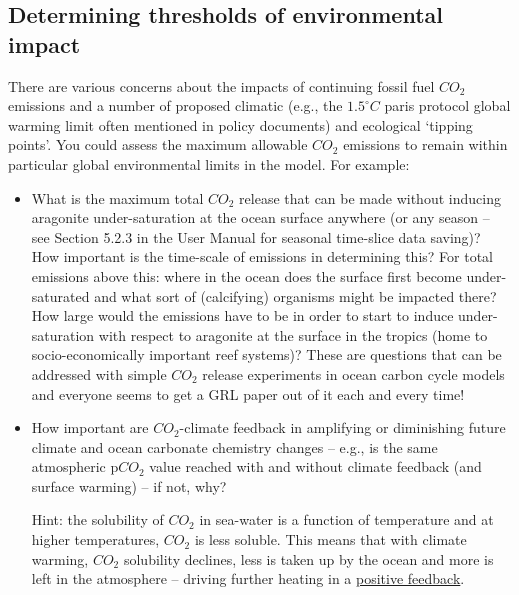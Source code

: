 \subsection{Determining thresholds of environmental impact}

There are various concerns about the impacts of continuing fossil fuel \(CO_{2}\) emissions and a number of proposed climatic (e.g., the \(1.5^{\circ} C \) paris protocol global warming limit often mentioned in policy documents) and ecological ‘tipping points’. You could assess the maximum allowable \(CO_{2}\) emissions to remain within particular global environmental limits in the model. For example:

\begin{itemize}[noitemsep]

\vspace{1mm}
\item What is the maximum total \(CO_{2}\) release that can be made without inducing aragonite under-saturation at the ocean surface anywhere (or any season – see Section 5.2.3 in the User Manual for seasonal time-slice data saving)? How important is the time-scale of emissions in determining this? For total emissions above this: where in the ocean does the surface first become under-saturated and what sort of (calcifying) organisms might be impacted there? How large would the emissions have to be in order to start to induce under-saturation with respect to aragonite at the surface in the tropics (home to socio-economically important reef systems)? These are questions that can be addressed with simple \(CO_{2}\) release experiments in ocean carbon cycle models and everyone seems to get a GRL paper out of it each and every time!

\vspace{1mm}
\item How important are \(CO_{2}\)-climate feedback in amplifying or diminishing future climate and ocean carbonate chemistry changes – e.g., is the same atmospheric p\(CO_{2}\) value reached with and without climate feedback (and surface warming) – if not, why? 

Hint: the solubility of \(CO_{2}\) in sea-water is a function of temperature and at higher temperatures, \(CO_{2}\) is less soluble. This means that with climate warming, \(CO_{2}\) solubility declines, less is taken up by the ocean and more is left in the atmosphere -- driving further heating in a \uline{positive feedback}.

\vspace{1mm}


\end{itemize}
